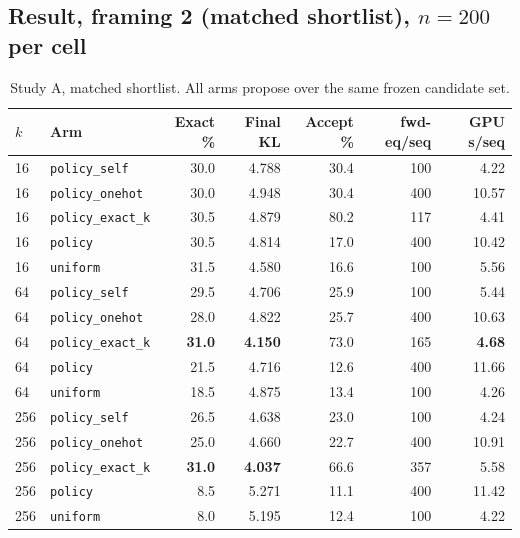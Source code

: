 \documentclass[11pt,a4paper]{article}
\begin{document}
\subsection{Result, framing 2 (matched shortlist), $n=200$ per cell}

\begin{table}[htbp]
\centering
\begin{tabular}{llrrrrr}
\toprule
$k$ & Arm & Exact \% & Final KL & Accept \% & fwd-eq/seq & GPU s/seq \\
\midrule
16 & \texttt{policy\_self}    & 30.0 & 4.788 & 30.4 & 100 & 4.22 \\
16 & \texttt{policy\_onehot}  & 30.0 & 4.948 & 30.4 & 400 & 10.57 \\
16 & \texttt{policy\_exact\_k}& 30.5 & 4.879 & 80.2 & 117 & 4.41 \\
16 & \texttt{policy}          & 30.5 & 4.814 & 17.0 & 400 & 10.42 \\
16 & \texttt{uniform}         & 31.5 & 4.580 & 16.6 & 100 & 5.56 \\
\midrule
64 & \texttt{policy\_self}    & 29.5 & 4.706 & 25.9 & 100 & 5.44 \\
64 & \texttt{policy\_onehot}  & 28.0 & 4.822 & 25.7 & 400 & 10.63 \\
64 & \texttt{policy\_exact\_k}& \textbf{31.0} & \textbf{4.150} & 73.0 & 165 & \textbf{4.68} \\
64 & \texttt{policy}          & 21.5 & 4.716 & 12.6 & 400 & 11.66 \\
64 & \texttt{uniform}         & 18.5 & 4.875 & 13.4 & 100 & 4.26 \\
\midrule
256 & \texttt{policy\_self}    & 26.5 & 4.638 & 23.0 & 100 & 4.24 \\
256 & \texttt{policy\_onehot}  & 25.0 & 4.660 & 22.7 & 400 & 10.91 \\
256 & \texttt{policy\_exact\_k}& \textbf{31.0} & \textbf{4.037} & 66.6 & 357 & 5.58 \\
256 & \texttt{policy}          &  8.5 & 5.271 & 11.1 & 400 & 11.42 \\
256 & \texttt{uniform}         &  8.0 & 5.195 & 12.4 & 100 & 4.22 \\
\bottomrule
\end{tabular}
\caption{Study A, matched shortlist. All arms propose over the same frozen candidate
set.}
\end{table}
\end{document}
